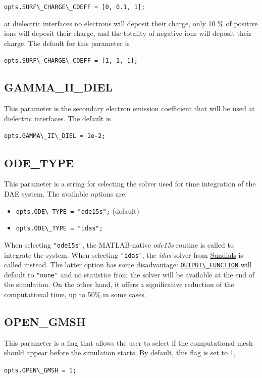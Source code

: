 \documentclass[12pt,a4paper]{article}
\newcommand{\matlabs}[1]{{\lstinline[style=MatlabStyle]!#1!}}
\newcommand{\seclink}[2]{%
	\begingroup
	\hypersetup{linkcolor=orange}%
	\hyperref[sec:#1]{\matlabs{#2}}%
	\endgroup
}
\begin{document}
	\matlabs{opts.SURF\_CHARGE\_COEFF = [0, 0.1, 1];}
	
	\noindent at dielectric interfaces no electrons will deposit their charge, only 10 \% of positive ions will deposit their charge, and the totality of negative ions will deposit their charge. The default for this parameter is 
	
	\matlabs{opts.SURF\_CHARGE\_COEFF = [1, 1, 1];}
	
	\subsection{GAMMA\_II\_DIEL}
	\label{sec:gammaIIdiel}
	This parameter is the secondary electron emission coefficient that will be used at dielectric interfaces.
	The default is
	
	\matlabs{opts.GAMMA\_II\_DIEL = 1e-2;}
	
	\subsection{ODE\_TYPE}
	\label{sec:odetype}
	This parameter is a string for selecting the solver used for time integration of the DAE system. 
	The available options are:
	\begin{itemize}
		\item \matlabs{opts.ODE\_TYPE = "ode15s";} (default)
		\item \matlabs{opts.ODE\_TYPE = "idas";}
	\end{itemize}
	When selecting \matlabs{"ode15s"}, the MATLAB-native \textit{ode15s} routine is called to integrate the system. When selecting \matlabs{"idas"}, the \textit{idas} solver from \href{https://sundials.readthedocs.io/en/latest/index.html}{Sundials} is called instead. The latter option has some disadvantage: \seclink{outputfunction}{OUTPUT\_FUNCTION} will default to \matlabs{"none"} and no statistics from the solver will be available at the end of the simulation. On the other hand, it offers a significative reduction of the computational time, up to 50\% in some cases.
	
	\subsection{OPEN\_GMSH}
	\label{sec:opengmsh}
	This parameter is a flag that allows the user to select if the computational mesh should appear before the simulation starts.
	By default, this flag is set to 1,
	
	\matlabs{opts.OPEN\_GMSH = 1;}
	
\end{document}
